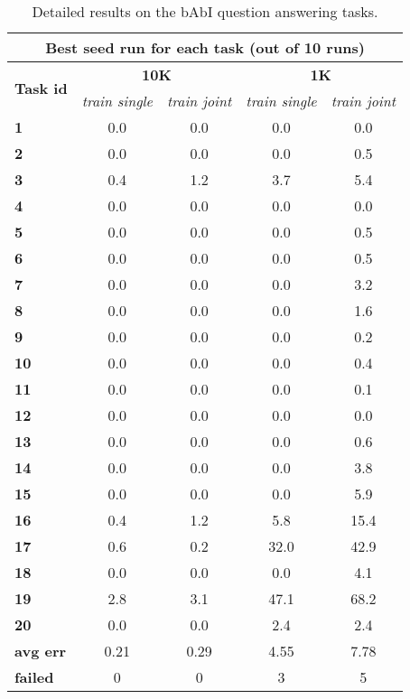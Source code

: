 \begin{table}[t!]
\centering
\caption{Detailed results on the bAbI question answering tasks.}
\label{tbl:babi_details}
\begin{subtable}{0.6\textwidth}
\centering
\begin{adjustbox}{max width=\textwidth}
\begin{tabular}{lcccc}
\toprule
\multicolumn{5}{c}{\bf Best seed run for each task (out of 10 runs) } \\ \midrule
\multirow{2}{*}{ \bf Task id } & \multicolumn{2}{c}{ \bf 10K } & \multicolumn{2}{c}{ \bf 1K } \\  \cmidrule{2-5}
& \textit{train single} & \textit{train joint} & \textit{train single} & \textit{train joint} \\ \midrule
\bf 1 & 0.0 & 0.0 & 0.0 & 0.0 \\
\bf 2 & 0.0 & 0.0 & 0.0 & 0.5 \\
\bf 3 & 0.4 & 1.2 & 3.7 & 5.4 \\
\bf 4 & 0.0 & 0.0 & 0.0 & 0.0 \\
\bf 5 & 0.0 & 0.0 & 0.0 & 0.5 \\
\bf 6 & 0.0 & 0.0 & 0.0 & 0.5 \\
\bf 7 & 0.0 & 0.0 & 0.0 & 3.2 \\
\bf 8 & 0.0 & 0.0 & 0.0 & 1.6 \\
\bf 9 & 0.0 & 0.0 & 0.0 & 0.2 \\
\bf 10 & 0.0 & 0.0 & 0.0 & 0.4 \\
\bf 11 & 0.0 & 0.0 & 0.0 & 0.1 \\
\bf 12 & 0.0 & 0.0 & 0.0 & 0.0 \\
\bf 13 & 0.0 & 0.0 & 0.0 & 0.6 \\
\bf 14 & 0.0 & 0.0 & 0.0 & 3.8 \\
\bf 15 & 0.0 & 0.0 & 0.0 & 5.9 \\
\bf 16 & 0.4 & 1.2 & 5.8 & 15.4 \\
\bf 17 & 0.6 & 0.2 & 32.0 & 42.9 \\
\bf 18 & 0.0 & 0.0 & 0.0 & 4.1 \\
\bf 19 & 2.8 & 3.1 & 47.1 & 68.2 \\
\bf 20 & 0.0 & 0.0 & 2.4 & 2.4 \\ \midrule
\bf avg err & 0.21 & 0.29 & 4.55 & 7.78 \\ \midrule
\bf failed & 0 & 0 & 3 & 5 \\
\bottomrule
\end{tabular}
\end{adjustbox}
\end{subtable}

\end{table}
